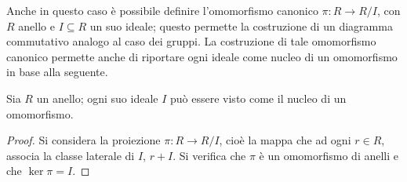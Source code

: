 \documentclass[11pt, a4paper]{scrartcl}
\theoremstyle{definition}
\numberwithin{esempio}{section}
\theoremstyle{definition}
\numberwithin{obs}{section}
\numberwithin{nota}{section}
\numberwithin{equation}{subsection}
\begin{document}
\noindent Anche in questo caso \`e possibile definire l'omomorfismo canonico $\pi : R \to R / I$, con $R$ anello e $I \subseteq R$ un suo ideale; questo permette la costruzione di un diagramma commutativo analogo al caso dei gruppi.
La costruzione di tale omomorfismo canonico permette anche di riportare ogni ideale come nucleo di un omomorfismo in base alla seguente.
\begin{prop}
	{}{}
	Sia $R$ un anello; ogni suo ideale $I$ pu\`o essere visto come il nucleo di un omomorfismo.
	\begin{proof}
		Si considera la proiezione $\pi : R \to R / I$, cio\`e la mappa che ad ogni $r \in R$, associa la classe laterale di $I$, $r + I$.
		Si verifica che $\pi$ \`e un omomorfismo di anelli e che $\operatorname{ker} \pi = I$.
	\end{proof}
\end{prop}
\end{document}
